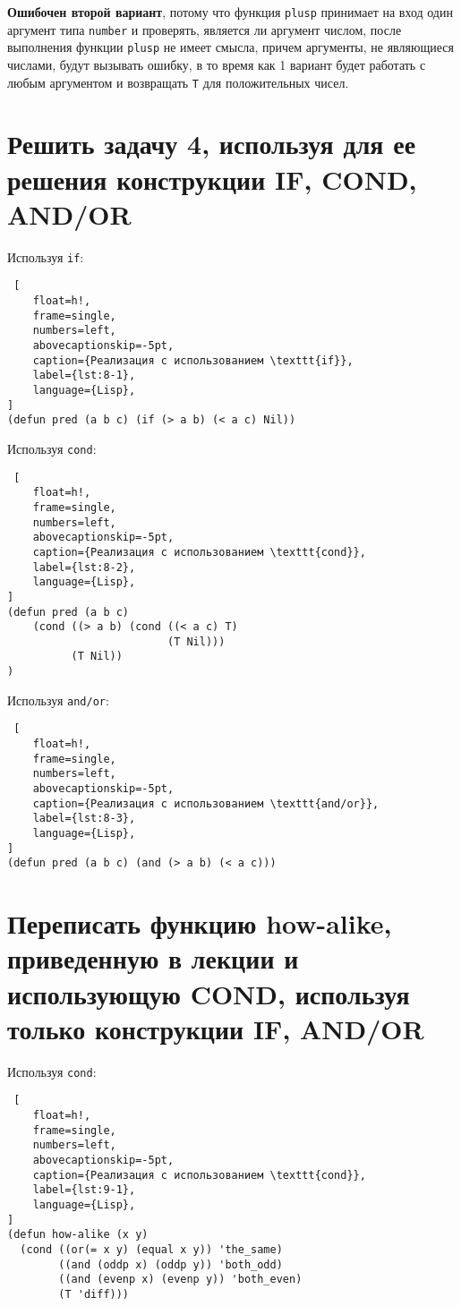\textbf{Ошибочен второй вариант}, потому что функция \texttt{plusp} принимает на вход один аргумент типа \texttt{number} и проверять, является ли аргумент числом, после выполнения функции \texttt{plusp} не имеет смысла, причем аргументы, не являющиеся числами, будут вызывать ошибку, в то время как 1 вариант будет работать с любым аргументом и возвращать \texttt{T} для положительных чисел.


\section{Решить задачу 4, используя для ее решения конструкции IF, COND, AND/OR}

Используя \texttt{if}:

\begin{lstlisting} [
	float=h!,
	frame=single,
	numbers=left,
	abovecaptionskip=-5pt,
	caption={Реализация с использованием \texttt{if}},
	label={lst:8-1},
	language={Lisp},
]
(defun pred (a b c) (if (> a b) (< a c) Nil))
\end{lstlisting}

Используя \texttt{cond}:

\begin{lstlisting} [
	float=h!,
	frame=single,
	numbers=left,
	abovecaptionskip=-5pt,
	caption={Реализация с использованием \texttt{cond}},
	label={lst:8-2},
	language={Lisp},
]
(defun pred (a b c)
    (cond ((> a b) (cond ((< a c) T) 
                         (T Nil)))
          (T Nil))
)
\end{lstlisting}

Используя \texttt{and/or}:

\begin{lstlisting} [
	float=h!,
	frame=single,
	numbers=left,
	abovecaptionskip=-5pt,
	caption={Реализация с использованием \texttt{and/or}},
	label={lst:8-3},
	language={Lisp},
]
(defun pred (a b c) (and (> a b) (< a c)))
\end{lstlisting}

\section{Переписать функцию how-alike, приведенную в лекции и использующую COND, используя
только конструкции IF, AND/OR}

Используя \texttt{cond}:

\begin{lstlisting} [
	float=h!,
	frame=single,
	numbers=left,
	abovecaptionskip=-5pt,
	caption={Реализация с использованием \texttt{cond}},
	label={lst:9-1},
	language={Lisp},
]
(defun how-alike (x y)
  (cond ((or(= x y) (equal x y)) 'the_same)
        ((and (oddp x) (oddp y)) 'both_odd) 
        ((and (evenp x) (evenp y)) 'both_even) 
        (T 'diff)))
\end{lstlisting}

